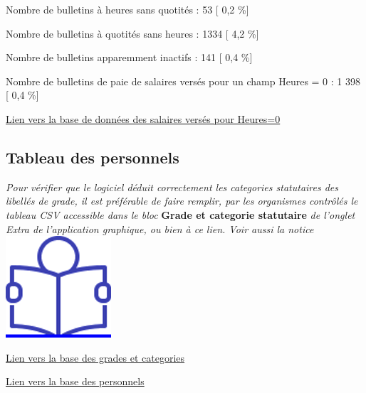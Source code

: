 Nombre de bulletins à heures sans quotités : 53 {[} 0,2 \%{]}

Nombre de bulletins à quotités sans heures : 1334 {[} 4,2 \%{]}

Nombre de bulletins apparemment inactifs : 141 {[} 0,4 \%{]}

Nombre de bulletins de paie de salaires versés pour un champ Heures = 0
: 1 398 {[} 0,4 \%{]}

\href{../Bases/Fiabilite/base.heures.nulles.salaire.nonnull.csv}{Lien vers
la base de données des salaires versés pour Heures=0}

\hypertarget{tableau-des-personnels}{%
\subsection{Tableau des personnels}\label{tableau-des-personnels}}

\emph{Pour vérifier que le logiciel déduit correctement les categories
statutaires des libellés de grade, il est préférable de faire remplir,
par les organismes contrôlés le tableau CSV accessible dans le bloc}
\textbf{Grade et categorie statutaire} \emph{de l'onglet Extra de
l'application graphique, ou bien à ce lien. Voir aussi la notice} ~
\href{../Docs/Notices/fiche_tableau_categories.odt}{\includegraphics{icones/Notice.png}}

\href{../Bases/Effectifs/grades.categories.csv}{Lien vers la base des
grades et categories}

\href{../Bases/Effectifs/matricules.csv}{Lien vers la base des personnels}
